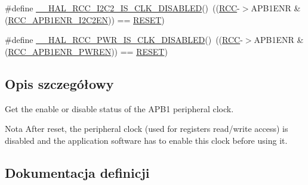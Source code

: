 \begin{DoxyCompactItemize}
\item 
\#define \hyperlink{group___r_c_c___a_p_b1___peripheral___clock___enable___disable___status_gae051ecb26de5c5b44f1827923c9837a5}{\+\_\+\+\_\+\+H\+A\+L\+\_\+\+R\+C\+C\+\_\+\+I2\+C2\+\_\+\+I\+S\+\_\+\+C\+L\+K\+\_\+\+D\+I\+S\+A\+B\+L\+ED}()~((\hyperlink{group___peripheral__declaration_ga74944438a086975793d26ae48d5882d4}{R\+CC}-\/$>$A\+P\+B1\+E\+NR \& (\hyperlink{group___peripheral___registers___bits___definition_gafd7d1c3c7dbe20aea87a694ae15840f6}{R\+C\+C\+\_\+\+A\+P\+B1\+E\+N\+R\+\_\+\+I2\+C2\+EN})) == \hyperlink{group___exported__types_gga89136caac2e14c55151f527ac02daaffa589b7d94a3d91d145720e2fed0eb3a05}{R\+E\+S\+ET})
\item 
\#define \hyperlink{group___r_c_c___a_p_b1___peripheral___clock___enable___disable___status_ga1019fdeb30eb4bcb23a0bea2278a94a2}{\+\_\+\+\_\+\+H\+A\+L\+\_\+\+R\+C\+C\+\_\+\+P\+W\+R\+\_\+\+I\+S\+\_\+\+C\+L\+K\+\_\+\+D\+I\+S\+A\+B\+L\+ED}()~((\hyperlink{group___peripheral__declaration_ga74944438a086975793d26ae48d5882d4}{R\+CC}-\/$>$A\+P\+B1\+E\+NR \& (\hyperlink{group___peripheral___registers___bits___definition_ga5c19997ccd28464b80a7c3325da0ca60}{R\+C\+C\+\_\+\+A\+P\+B1\+E\+N\+R\+\_\+\+P\+W\+R\+EN})) == \hyperlink{group___exported__types_gga89136caac2e14c55151f527ac02daaffa589b7d94a3d91d145720e2fed0eb3a05}{R\+E\+S\+ET})
\end{DoxyCompactItemize}


\subsection{Opis szczegółowy}
Get the enable or disable status of the A\+P\+B1 peripheral clock. 

\begin{DoxyNote}{Nota}
After reset, the peripheral clock (used for registers read/write access) is disabled and the application software has to enable this clock before using it. 
\end{DoxyNote}


\subsection{Dokumentacja definicji}
\mbox{\label{group___r_c_c___a_p_b1___peripheral___clock___enable___disable___status_ga8868ab331b4bb14a1d5cc55c9133e4de}} 
